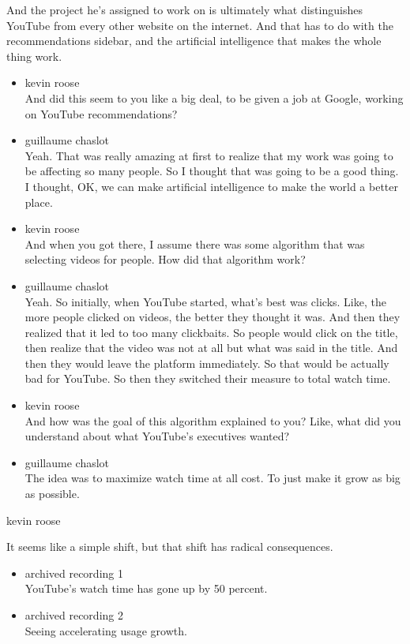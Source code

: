 And the project he's assigned to work on is ultimately what
distinguishes YouTube from every other website on the internet. And that
has to do with the recommendations sidebar, and the artificial
intelligence that makes the whole thing work.

\begin{itemize}
\item
  kevin roose\\
  And did this seem to you like a big deal, to be given a job at Google,
  working on YouTube recommendations?
\item
  guillaume chaslot\\
  Yeah. That was really amazing at first to realize that my work was
  going to be affecting so many people. So I thought that was going to
  be a good thing. I thought, OK, we can make artificial intelligence to
  make the world a better place.
\item
  kevin roose\\
  And when you got there, I assume there was some algorithm that was
  selecting videos for people. How did that algorithm work?
\item
  guillaume chaslot\\
  Yeah. So initially, when YouTube started, what's best was clicks.
  Like, the more people clicked on videos, the better they thought it
  was. And then they realized that it led to too many clickbaits. So
  people would click on the title, then realize that the video was not
  at all but what was said in the title. And then they would leave the
  platform immediately. So that would be actually bad for YouTube. So
  then they switched their measure to total watch time.
\item
  kevin roose\\
  And how was the goal of this algorithm explained to you? Like, what
  did you understand about what YouTube's executives wanted?
\item
  guillaume chaslot\\
  The idea was to maximize watch time at all cost. To just make it grow
  as big as possible.
\end{itemize}

kevin roose

It seems like a simple shift, but that shift has radical consequences.

\begin{itemize}
\item
  archived recording 1\\
  YouTube's watch time has gone up by 50 percent.
\item
  archived recording 2\\
  Seeing accelerating usage growth.
\end{itemize}


